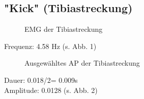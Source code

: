 \subsection{"{}Kick"{} (Tibiastreckung)}
\begin{figure}[H]
\caption{EMG der Tibiastreckung}
\label{kick}
\end{figure}
Frequenz: 4.58 Hz (s. Abb. 1)

\begin{figure}[H]
\caption{Ausgewähltes AP der Tibiastreckung}
\label{kick-ap}
\end{figure}

Dauer: 0.018/2= 0.009s\\
Amplitude: 0.0128 (s. Abb. 2)

